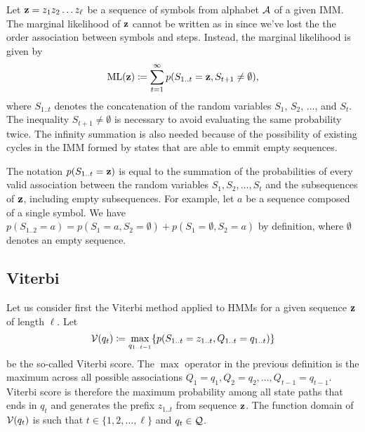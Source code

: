 Let $\mathbf{z}=z_1z_2 \dots z_\ell$ be a sequence of symbols from alphabet $\mathcal{A}$ of a given IMM.\@
The marginal likelihood of $\mathbf{z}$ cannot be written as in  since
we've lost the the order association between symbols and steps.
Instead, the marginal likelihood is given by
\begin{equation}\label{eq:ml}
  \mathrm{ML}(\mathbf{z}) \coloneqq \sum_{t=1}^{\infty} p(S_{1..t}=\mathbf{z}, S_{t+1}\neq \emptyset),
\end{equation}
where $S_{1..t}$ denotes the concatenation of the random variables $S_1$, $S_2$, $\dots$, and $S_t$.
The inequality $S_{t+1}\neq \emptyset$ is necessary to avoid evaluating the same probability twice.
The infinity summation is also needed because of the possibility of existing cycles in the IMM
formed by states that are able to emmit empty sequences.

\begin{remark}
  The notation $p(S_{1..t}=\mathbf{z})$ is equal to the summation of the probabilities of every valid
  association between the random variables $S_1, S_2, \dots, S_t$ and the subsequences of $\mathbf{z}$,
  including empty subsequences. For example, let $a$ be a sequence composed of a single symbol. We
  have $p(S_{1..2}=a) = p(S_1=a, S_2=\emptyset) + p(S_1=\emptyset, S_2=a)$ by definition, where
  $\emptyset$ denotes an empty sequence.
\end{remark}

\subsection{Viterbi}

Let us consider first the Viterbi method applied to HMMs for a given sequence $\mathbf{z}$ of length
$\ell$.
Let
\begin{equation*}
  \mathcal{V}(q_t) \coloneqq \underset{q_{1..t-1}}{\max} \{ p(S_{1..t}=z_{1..t}, Q_{1..t}=q_{1..t}) \}
\end{equation*}
be the so-called Viterbi score. The $\max$ operator in the previous definition is the maximum across
all possible associations $Q_1=q_1, Q_2=q_2, \dots, Q_{t-1}=q_{t-1}$. Viterbi score is therefore the
maximum probability among all state paths that ends in $q_t$ and generates the prefix $z_{1..t}$
from sequence $\mathbf{z}$. The function domain of $\mathcal{V}(q_t)$ is such that $t \in \{1, 2, \dots,
\ell\}$ and $q_t \in \mathcal{Q}$.

